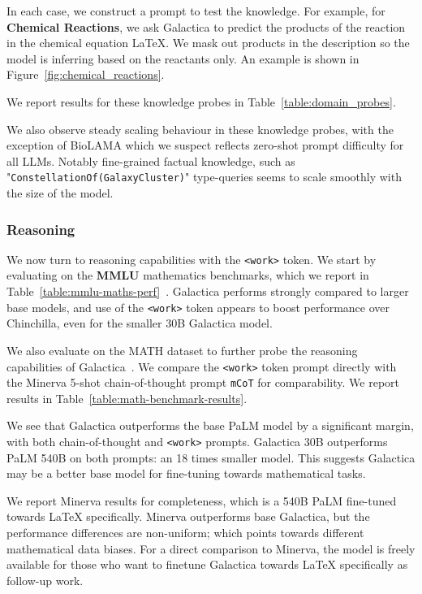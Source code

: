 In each case, we construct a prompt to test the knowledge. For example, for \textbf{Chemical Reactions}, we ask Galactica to predict the products of the reaction in the chemical equation LaTeX. We mask out products in the description so the model is inferring based on the reactants only. An example is shown in Figure~\ref{fig:chemical_reactions}.

We report results for these knowledge probes in Table~\ref{table:domain_probes}.

We also observe steady scaling behaviour in these knowledge probes, with the exception of BioLAMA which we suspect reflects zero-shot prompt difficulty for all LLMs. Notably fine-grained factual knowledge, such as "\texttt{ConstellationOf(GalaxyCluster)}" type-queries seems to scale smoothly with the size of the model.

\subsubsection{Reasoning}

We now turn to reasoning capabilities with the \verb|<work>| token. We start by evaluating on the \textbf{MMLU} mathematics benchmarks, which we report in Table~\ref{table:mmlu-maths-perf}~\citep{MMMLU}. Galactica performs strongly compared to larger base models, and use of the \verb|<work>| token appears to boost performance over Chinchilla, even for the smaller 30B Galactica model.

We also evaluate on the MATH dataset to further probe the reasoning capabilities of Galactica~\citep{MATH}. We compare the \verb|<work>| token prompt directly with the Minerva 5-shot chain-of-thought prompt \verb|mCoT| for comparability. We report results in Table~\ref{table:math-benchmark-results}.

We see that Galactica outperforms the base PaLM model by a significant margin, with both chain-of-thought and \verb|<work>| prompts. Galactica 30B outperforms PaLM 540B on both prompts: an 18 times smaller model. This suggests Galactica may be a better base model for fine-tuning towards mathematical tasks.

We report Minerva results for completeness, which is a 540B PaLM fine-tuned towards LaTeX specifically. Minerva outperforms base Galactica, but the performance differences are non-uniform; which points towards different mathematical data biases. For a direct comparison to Minerva, the model is freely available for those who want to finetune Galactica towards LaTeX specifically as follow-up work.

